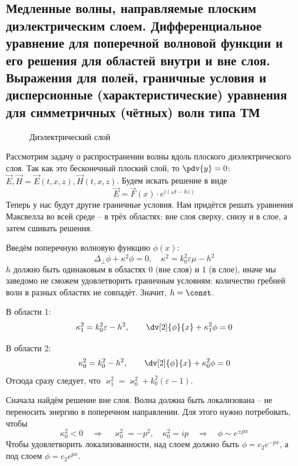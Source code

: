 \subsection{Медленные волны, направляемые плоским диэлектрическим слоем. Дифференциальное уравнение для поперечной волновой функции и его решения для областей внутри и вне слоя. Выражения для полей, граничные условия и дисперсионные (характеристические) уравнения для симметричных (чётных) волн типа ТМ}

\begin{figure}[ht]
    \centering
    \caption{Диэлектрический слой}
    \label{fig:test-fig}
\end{figure}
Рассмотрим задачу о распространении волны вдоль плоского диэлектрического слоя. Так как это бесконечный плоский слой, то $\pdv{y}=0$: $\vec{E},\vec{H} = \vec{E}(t,x,z), \vec{H}(t,x,z)$.
Будем искать решение в виде
\begin{equation}
    \vec{E} = \vec{F}(x) \cdot e^{i(\omega t-hz)} 
\end{equation}
Теперь у нас будут другие граничные условия. Нам придётся решать уравнения Максвелла во всей среде -- в трёх областях: вне слоя сверху, снизу и в слое, а затем сшивать решения.

Введём поперечную волновую функцию $\phi(x)$:
\begin{equation}
    \Delta_\perp \phi  + \kappa^2 \phi = 0, \quad \kappa^2=k_0^2 \varepsilon \mu - h^2
\end{equation}
$h$ должно быть одинаковым в областях 0 (вне слоя) и 1 (в слое), иначе мы заведомо не сможем удовлетворить граничным условиям: количество гребней волн в разных областях не совпадёт. Значит, $h=\const$.

В области 1:
\begin{equation}
    \kappa_1^2 = k_0^2 \varepsilon - h^2, \qquad \dv[2]{\phi}{x}+\kappa_1^2\phi=0
\end{equation}

В области 2:
\begin{equation}
    \kappa_0^2 = k_0^2-h^2, \qquad \dv[2]{\phi}{x}+\kappa_0^2\phi=0
\end{equation}
Отсюда сразу следует, что $\varkappa_1^2 = \varkappa_0^2 + k_0^2(\varepsilon-1)$.

Сначала найдём решение вне слоя. Волна должна быть локализована -- не переносить
энергию в поперечном направлении. Для этого нужно потребовать, чтобы
\begin{equation}
    \kappa_0^2<0 
    \quad\Rightarrow\quad 
    \varkappa_0^2 = -p^2, \quad
    \kappa_0^2 = ip 
    \quad\Rightarrow\quad 
    \phi \sim e^{\pm p x}
\end{equation}
Чтобы удовлетворить локализованности, над слоем должно быть $\phi=c_2 e^{-px}$, а под слоем $\phi=c_2 e^{px}$.

